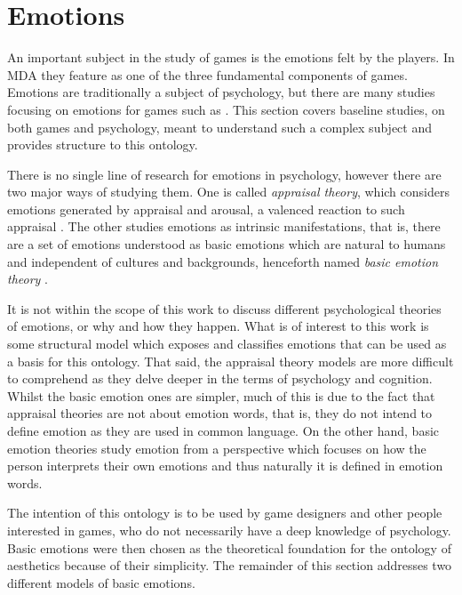 \section{Emotions}
An important subject in the study of games is the emotions felt by the players. In MDA they feature as one of the three fundamental components of games. Emotions are traditionally a subject of psychology, but there are many studies focusing on emotions for games such as \cite{dillon_way_2010,bateman_implicit_2015,angelides_empirical_2014,karpouzis_emotion_2016}. This section covers baseline studies, on both games and psychology, meant to understand such a complex subject and provides structure to this ontology.

There is no single line of research for emotions in psychology, however there are two major ways of studying them. One is called \textit{appraisal theory}, which considers emotions generated by appraisal and arousal, a valenced reaction to such appraisal \citep{ortony1990cognitive,scherer_appraisal_2001}. The other studies emotions as intrinsic manifestations, that is, there are a set of emotions understood as basic emotions which are natural to humans and independent of cultures and backgrounds, henceforth named \textit{basic emotion theory} \citep{ekman_are_basic_emotions_nodate,ekman_what_scientist_agree_2016}.

It is not within the scope of this work to discuss different psychological theories of emotions, or why and how they happen. What is of interest to this work is some structural model which exposes and classifies emotions that can be used as a basis for this ontology. That said, the appraisal theory models are more difficult to comprehend as they delve deeper in the terms of psychology and cognition. Whilst the basic emotion ones are simpler, much of this is due to the fact that appraisal theories are not about emotion words, that is, they do not intend to define emotion as they are used in common language. On the other hand, basic emotion theories study emotion from a perspective which focuses on how the person interprets their own emotions and thus naturally it is defined in emotion words. 

The intention of this ontology is to be used by game designers and other people interested in games, who do not necessarily have a deep knowledge of psychology. Basic emotions were then chosen as the theoretical foundation for the ontology of aesthetics because of their simplicity. The remainder of this section addresses two different models of basic emotions.

